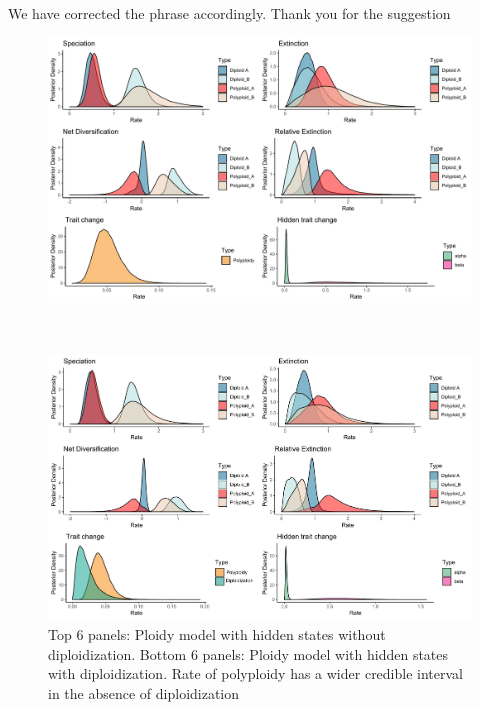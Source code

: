 \documentclass[11pt]{article}
\begin{document}
We have corrected the phrase accordingly.
Thank you for the suggestion
\begin{figure}
    \centering 
      \begin{minipage}[b]{0.5\textwidth}
    \includegraphics[width=\textwidth]{hisseDPnodipasymposteriordist.pdf} 
    \end{minipage}\\
    \vspace{1cm}
    \begin{minipage}[b]{0.5\textwidth}
        \includegraphics[width=\textwidth]{hisseDPasymposteriordist.pdf}
        \end{minipage}
    \caption{ Top 6 panels: Ploidy model with hidden states without diploidization. Bottom 6 panels: Ploidy model with hidden states with diploidization. Rate of polyploidy has a wider credible interval in the absence of diploidization}
    \label{figure:hissedip}
\end{figure}
\end{document}
